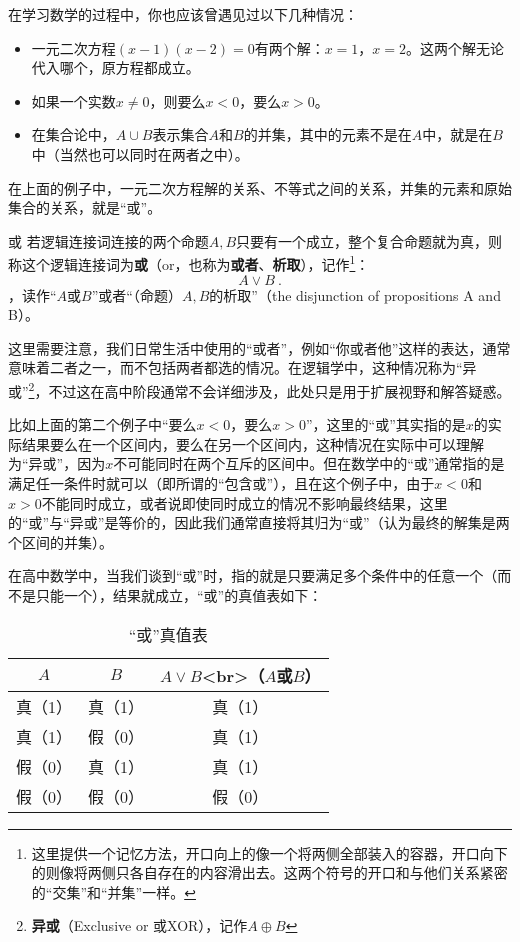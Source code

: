 在学习数学的过程中，你也应该曾遇见过以下几种情况：
\begin{itemize}
\item 一元二次方程$(x-1)(x-2)=0$有两个解：$x=1$，$x=2$。这两个解无论代入哪个，原方程都成立。
\item 如果一个实数$x\neq0$，则要么$x<0$，要么$x>0$。
\item 在集合论中，$A \cup B$表示集合$A$和$B$的并集，其中的元素不是在$A$中，就是在$B$中（当然也可以同时在两者之中）。
\end{itemize}
在上面的例子中，一元二次方程解的关系、不等式之间的关系，并集的元素和原始集合的关系，就是“或”。
\begin{definition}{或}\label{def_HsCoPr_2}
若逻辑连接词连接的两个命题$A,B$只要有一个成立，整个复合命题就为真，则称这个逻辑连接词为\textbf{或}（or，也称为\textbf{或者}、\textbf{析取}），记作\footnote{这里提供一个记忆方法，开口向上的像一个将两侧全部装入的容器，开口向下的则像将两侧只各自存在的内容滑出去。这两个符号的开口和与他们关系紧密的“交集”和“并集”一样。}：
\begin{equation}
A\lor B~.
\end{equation}
，读作“$A$或$B$”或者“（命题）$A,B$的析取”（the disjunction of propositions A and B）。
\end{definition}

这里需要注意，我们日常生活中使用的“或者”，例如“你或者他”这样的表达，通常意味着二者之一，而不包括两者都选的情况。在逻辑学中，这种情况称为“异或”\footnote{\textbf{异或}（Exclusive or 或XOR），记作$A\oplus B$}，不过这在高中阶段通常不会详细涉及，此处只是用于扩展视野和解答疑惑。

比如上面的第二个例子中“要么$x<0$，要么$x>0$”，这里的“或”其实指的是$x$的实际结果要么在一个区间内，要么在另一个区间内，这种情况在实际中可以理解为“异或”，因为$x$不可能同时在两个互斥的区间中。但在数学中的“或”通常指的是满足任一条件时就可以（即所谓的“包含或”），且在这个例子中，由于$x < 0$和$x > 0$不能同时成立，或者说即使同时成立的情况不影响最终结果，这里的“或”与“异或”是等价的，因此我们通常直接将其归为“或”（认为最终的解集是两个区间的并集）。

在高中数学中，当我们谈到“或”时，指的就是只要满足多个条件中的任意一个（而不是只能一个），结果就成立，“或”的真值表如下：

\begin{table}[ht]
\centering
\caption{“或”真值表}\label{tab_HsCoPr2}
\begin{tabular}{|c|c|c|}
\hline
$A$ & $B$ & $A \lor B$<br>（$A$或$B$） \\
\hline
真（1） & 真（1） & 真（1） \\
\hline
真（1） & 假（0） & 真（1） \\
\hline
假（0） & 真（1） & 真（1） \\
\hline
假（0） & 假（0） & 假（0） \\
\hline
\end{tabular}
\end{table}

